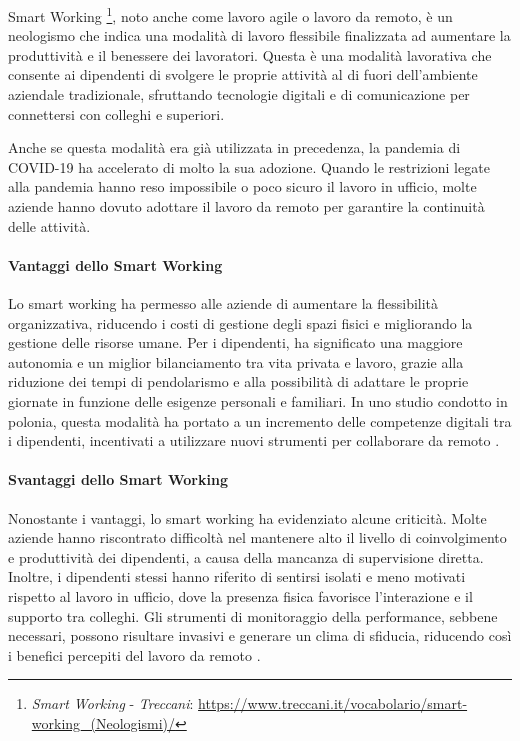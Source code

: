 \documentclass[12pt,a4paper,openright,twoside]{book}
\begin{document}
Smart Working \footnote{\emph{Smart Working} - \emph{Treccani}: \url{https://www.treccani.it/vocabolario/smart-working_(Neologismi)/}}, noto anche come lavoro agile o lavoro da remoto, è un neologismo che indica una modalità di lavoro flessibile finalizzata ad aumentare la produttività e il benessere dei lavoratori. Questa è una modalità lavorativa che consente ai dipendenti di svolgere le proprie attività al di fuori dell’ambiente aziendale tradizionale, sfruttando tecnologie digitali e di comunicazione per connettersi con colleghi e superiori.

Anche se questa modalità era già utilizzata in precedenza, la pandemia di COVID-19 ha accelerato di molto la sua adozione. Quando le restrizioni legate alla pandemia hanno reso impossibile o poco sicuro il lavoro in ufficio, molte aziende hanno dovuto adottare il lavoro da remoto per garantire la continuità delle attività\cite{urbaniec2022}.

\paragraph{Vantaggi dello Smart Working}
Lo smart working ha permesso alle aziende di aumentare la flessibilità organizzativa, riducendo i costi di gestione degli spazi fisici e migliorando la gestione delle risorse umane. Per i dipendenti, ha significato una maggiore autonomia e un miglior bilanciamento tra vita privata e lavoro, grazie alla riduzione dei tempi di pendolarismo e alla possibilità di adattare le proprie giornate in funzione delle esigenze personali e familiari. In uno studio condotto in polonia, questa modalità ha portato a un incremento delle competenze digitali tra i dipendenti, incentivati a utilizzare nuovi strumenti per collaborare da remoto \cite{urbaniec2022}.

\paragraph{Svantaggi dello Smart Working}
Nonostante i vantaggi, lo smart working ha evidenziato alcune criticità. Molte aziende hanno riscontrato difficoltà nel mantenere alto il livello di coinvolgimento e produttività dei dipendenti, a causa della mancanza di supervisione diretta. Inoltre, i dipendenti stessi hanno riferito di sentirsi isolati e meno motivati rispetto al lavoro in ufficio, dove la presenza fisica favorisce l’interazione e il supporto tra colleghi. Gli strumenti di monitoraggio della performance, sebbene necessari, possono risultare invasivi e generare un clima di sfiducia, riducendo così i benefici percepiti del lavoro da remoto \cite{urbaniec2022}.
\end{document}
